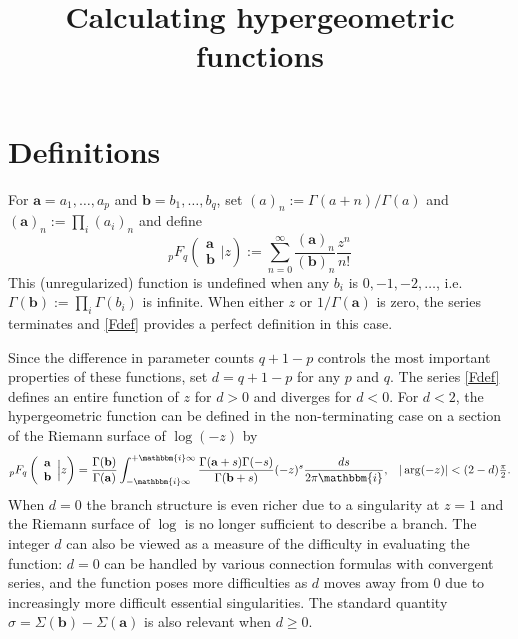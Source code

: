 \documentclass[12pt]{article}
\author{}
\title{Calculating hypergeometric functions}
\newcommand{\ii}[0] {\mathbbm{i}}
\numberwithin{equation}{section}
\newcommand{\FF}[6] {{}_{#1}{#2}_{#3} \left( \begin{array}{c} #4 \\ #5 \end{array} \Big| {#6}  \right)}
\newcommand{\FFf}[5] {{}_{#1}{#2}_{#3} \left(#4 | {#5} \right)}
\newcommand{\bfa}[0] {\mathbf{a}}
\newcommand{\bfb}[0] {\mathbf{b}}
\begin{document}
\maketitle



\section{Definitions}
For $\mathbf{a}=a_1,\dots,a_p$ and  $\mathbf{b}=b_1,\dots,b_q$, set $(a)_n := \Gamma(a+n)/\Gamma(a)$ and $(\mathbf{a})_n := \prod_i (a_i)_n$ and define
\begin{equation}
\label{Fdef}
\FF{p}{F}{q}{\mathbf{a}}{\mathbf{b}}{z} := \sum_{n=0}^{\infty} \frac{(\mathbf{a})_n}{(\mathbf{b})_n} \frac{z^n}{n!}
\end{equation}
This (unregularized) function is undefined when any $b_i$ is $0,-1,-2,\dots$, i.e. $\Gamma(\mathbf{b}) := \prod_i \Gamma(b_i)$ is infinite. When either $z$ or $1/\Gamma(\bfa)$ is zero, the series terminates and \eqref{Fdef} provides a perfect definition in this case.

Since the difference in parameter counts $q+1-p$ controls the most important properties of these functions, set $d=q+1-p$ for any $p$ and $q$. The series \eqref{Fdef} defines an entire function of $z$ for $d > 0$ and diverges for $d<0$. For $d<2$, the hypergeometric function can be defined in the non-terminating case on a section of the Riemann surface of $\log(-z)$ by
\begin{equation}
\label{mbint}
\FF{p}{F}{q}{\mathbf{a}}{\mathbf{b}}{z} = \frac{\Gamma(\mathbf{b})}{\Gamma(\mathbf{a})} \int_{-\ii \infty}^{+\ii \infty} \frac{\Gamma(\mathbf{a}+s) \Gamma(-s)}{\Gamma(\mathbf{b}+s)} (-z)^s \frac{ds}{2\pi \ii}\text{,} \quad |\arg(-z)| < (2-d) \tfrac{\pi}{2}\text{.}
\end{equation}
When $d=0$ the branch structure is even richer due to a singularity at $z=1$ and the Riemann surface of $\log$ is no longer sufficient to describe a branch. The integer $d$ can also be viewed as a measure of the difficulty in evaluating the function: $d=0$ can be handled by various connection formulas with convergent series, and the function poses more difficulties as $d$ moves away from $0$ due to increasingly more difficult essential singularities. The standard quantity
$\sigma = \Sigma(\mathbf{b}) - \Sigma(\mathbf{a})$ is also relevant when $d \ge 0$.
\end{document}
